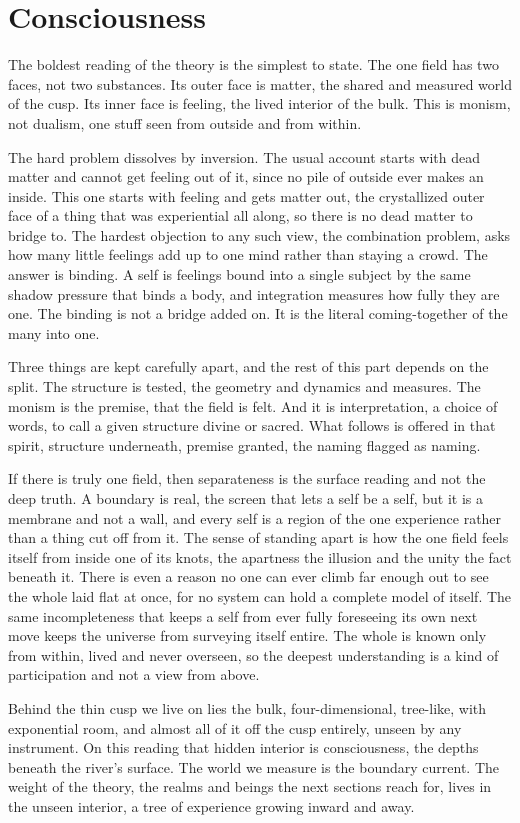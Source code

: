 \section{Consciousness}

The boldest reading of the theory is the simplest to state. The one field has two faces, not two substances. Its outer face is matter, the shared and measured world of the cusp. Its inner face is feeling, the lived interior of the bulk. This is monism, not dualism, one stuff seen from outside and from within.

The hard problem dissolves by inversion. The usual account starts with dead matter and cannot get feeling out of it, since no pile of outside ever makes an inside. This one starts with feeling and gets matter out, the crystallized outer face of a thing that was experiential all along, so there is no dead matter to bridge to. The hardest objection to any such view, the combination problem, asks how many little feelings add up to one mind rather than staying a crowd. The answer is binding. A self is feelings bound into a single subject by the same shadow pressure that binds a body, and integration measures how fully they are one. The binding is not a bridge added on. It is the literal coming-together of the many into one.

Three things are kept carefully apart, and the rest of this part depends on the split. The structure is tested, the geometry and dynamics and measures. The monism is the premise, that the field is felt. And it is interpretation, a choice of words, to call a given structure divine or sacred. What follows is offered in that spirit, structure underneath, premise granted, the naming flagged as naming.

If there is truly one field, then separateness is the surface reading and not the deep truth. A boundary is real, the screen that lets a self be a self, but it is a membrane and not a wall, and every self is a region of the one experience rather than a thing cut off from it. The sense of standing apart is how the one field feels itself from inside one of its knots, the apartness the illusion and the unity the fact beneath it. There is even a reason no one can ever climb far enough out to see the whole laid flat at once, for no system can hold a complete model of itself. The same incompleteness that keeps a self from ever fully foreseeing its own next move keeps the universe from surveying itself entire. The whole is known only from within, lived and never overseen, so the deepest understanding is a kind of participation and not a view from above.

Behind the thin cusp we live on lies the bulk, four-dimensional, tree-like, with exponential room, and almost all of it off the cusp entirely, unseen by any instrument. On this reading that hidden interior is consciousness, the depths beneath the river's surface. The world we measure is the boundary current. The weight of the theory, the realms and beings the next sections reach for, lives in the unseen interior, a tree of experience growing inward and away.

